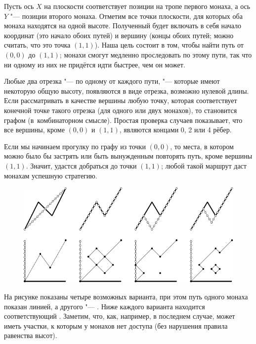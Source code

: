 \documentclass[twoside]{book}
\begin{document}
Пусть ось $X$ на плоскости соответствует позиции на тропе первого монаха, а ось $Y$ "--- позиции второго монаха.
Отметим все точки плоскости, для которых оба монаха находятся на одной высоте.
Полученный  будет включать в себя начало координат (это начало обоих путей) и вершину (концы обоих путей; можно считать, что это точка $(1,1)$).
Наша цель состоит в том, чтобы найти путь  от $(0,0)$ до $(1,1)$;
монахи смогут медленно проследовать по этому пути, так что ни одному из них не придётся идти быстрее, чем он может.

Любые два отрезка "--- по одному от каждого пути, "--- которые имеют некоторую общую высоту, появляются  в виде отрезка, возможно нулевой длины.
Если рассматривать в качестве вершины любую точку, которая соответствует конечной точке такого отрезка (для одного или двух монахов), то  становится графом (в~комбинаторном смысле).
Простая проверка случаев показывает, что все вершины, кроме $(0,0)$ и $(1,1)$, являются концами 0, 2 или 4 рёбер.


Если мы начинаем прогулку по графу из точки $(0,0)$, то  места, в котором можно было бы застрять или быть вынужденным повторять путь, кроме вершины $(1,1)$.
Значит, удастся добраться до точки $(1,1)$; любой такой маршрут даст монахам успешную стратегию.
\heart

\begin{figure}[h]
\centering
 \includegraphics{mp/wink-27}
\end{figure} 


На рисунке показаны четыре возможных варианта, при этом путь одного монаха показан  линией, а другого "--- .
Ниже каждого варианта находится соответствующий .
Заметим, что, как, например, в последнем случае,  может иметь участки, к которым у монахов нет доступа (без нарушения правила равенства высот).
\end{document}
